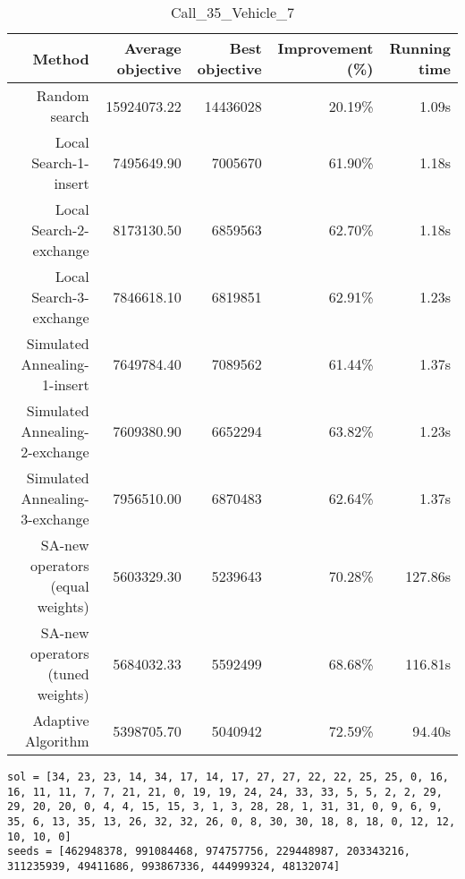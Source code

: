 \begin{table}[ht]
\centering
\caption{Call\_35\_Vehicle\_7}
\label{tab:call35vehicle7}
\begin{tabular}{|r|r|r|r|r|}
Method & Average objective & Best objective & Improvement (\%) & Running time \\
\hline
Random search & 15924073.22 & 14436028 & 20.19\% & 1.09s\\
Local Search-1-insert & 7495649.90 & 7005670 & 61.90\% & 1.18s\\
Local Search-2-exchange & 8173130.50 & 6859563 & 62.70\% & 1.18s\\
Local Search-3-exchange & 7846618.10 & 6819851 & 62.91\% & 1.23s\\
Simulated Annealing-1-insert & 7649784.40 & 7089562 & 61.44\% & 1.37s\\
Simulated Annealing-2-exchange & 7609380.90 & 6652294 & 63.82\% & 1.23s\\
Simulated Annealing-3-exchange & 7956510.00 & 6870483 & 62.64\% & 1.37s\\
SA-new operators (equal weights) & 5603329.30 & 5239643 & 70.28\% & 127.86s\\
SA-new operators (tuned weights) & 5684032.33 & 5592499 & 68.68\% & 116.81s\\
Adaptive Algorithm & 5398705.70 & 5040942 & 72.59\% & 94.40s\\
\end{tabular}%
\end{table}
\begin{lstlisting}[label={lst:call35vehicle7},caption=Optimal solution call\_35\_vehicle\_7]
sol = [34, 23, 23, 14, 34, 17, 14, 17, 27, 27, 22, 22, 25, 25, 0, 16, 16, 11, 11, 7, 7, 21, 21, 0, 19, 19, 24, 24, 33, 33, 5, 5, 2, 2, 29, 29, 20, 20, 0, 4, 4, 15, 15, 3, 1, 3, 28, 28, 1, 31, 31, 0, 9, 6, 9, 35, 6, 13, 35, 13, 26, 32, 32, 26, 0, 8, 30, 30, 18, 8, 18, 0, 12, 12, 10, 10, 0]
seeds = [462948378, 991084468, 974757756, 229448987, 203343216, 311235939, 49411686, 993867336, 444999324, 48132074]
\end{lstlisting}%
\clearpage


